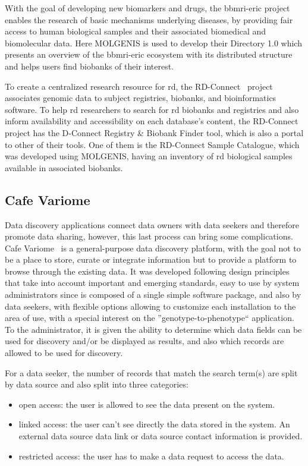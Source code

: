With the goal of developing new biomarkers and drugs, the \gls{bbmri-eric} project~\cite{bbmrieric} enables the research of basic mechanisms underlying diseases, by providing fair access to human biological samples and their associated biomedical and biomolecular data.
Here MOLGENIS is used to develop their Directory 1.0 which presents an overview of the \gls{bbmri-eric} ecosystem with its distributed structure and helps users find biobanks of their interest.

To create a centralized research resource for \gls{rd}, the RD-Connect~\cite{rdconnect} project associates genomic data to subject registries, biobanks, and bioinformatics software.
To help \gls{rd} researchers to search for \gls{rd} biobanks and registries and also inform availability and accessibility on each database's content, the RD-Connect project has the D-Connect Registry \& Biobank Finder tool, which is also a portal to other of their tools. One of them is the RD-Connect Sample Catalogue, which was developed using MOLGENIS, having an inventory of \gls{rd} biological samples available in associated biobanks.

\subsection*{Cafe Variome}
Data discovery applications connect data owners with data seekers and therefore promote data sharing, however, this last process can bring some complications.
Cafe Variome~\cite{cafevariome} is a general-purpose data discovery platform, with the goal not to be a place to store, curate or integrate information but to provide a platform to browse through the existing data.
It was developed following design principles that take into account important and emerging standards, easy to use by system administrators since is composed of a single simple software package, and also by data seekers, with flexible options allowing to customize each installation to the area of use, with a special interest on the  ''genotype-to-phenotype`` application.
To the administrator, it is given the ability to determine which data fields can be used for discovery and/or be displayed as results, and also which records are allowed to be used for discovery.

For a data seeker, the number of records that match the search term(s) are split by data source and also split into three categories:
\begin{itemize}
    \item open access: the user is allowed to see the data present on the system.
    \item linked access: the user can't see directly the data stored in the system.
        An external data source data link or data source contact information is provided.
    \item restricted access: the user has to make a data request to access the data.
\end{itemize}

